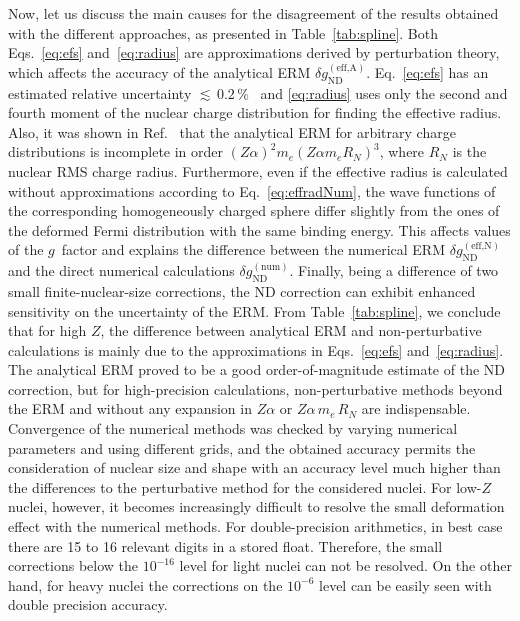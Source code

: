 Now, let us discuss the main causes for the disagreement of the results obtained with the different approaches, as presented in Table~\ref{tab:spline}. Both Eqs.~\eqref{eq:efs} and~\eqref{eq:radius} are approximations derived by perturbation theory, which affects the accuracy of the analytical ERM $\delta g_{\text{ND}}^{(\text{eff,A})}$. Eq.~\eqref{eq:efs} has an estimated relative uncertainty ${\scriptstyle\lesssim}\,0.2\,\%$~\cite{Shabaev1993} and \eqref{eq:radius} uses only the second and fourth moment of the nuclear charge distribution for finding the effective radius. Also, it was shown in Ref.~\cite{karshenboim2018} that the analytical ERM for arbitrary charge distributions is incomplete in order $(Z\alpha)^2m_e(Z\alpha m_e R_N)^3$, where $R_N$ is the nuclear RMS charge radius. Furthermore, even if the effective radius is calculated without approximations according to Eq.~\eqref{eq:effradNum}, the wave functions of the corresponding homogeneously charged sphere differ slightly from the ones of the deformed Fermi distribution with the same binding energy. This affects values of the $g$~factor and explains the difference between the numerical ERM $\delta g_{\text{ND}}^{(\text{eff,N})}$ and the direct numerical calculations $\delta g_{\text{ND}}^{(\text{num})}$. 
Finally, being a difference of two small finite-nuclear-size corrections, the ND correction can exhibit enhanced sensitivity on the uncertainty of the ERM.
From Table~\ref{tab:spline}, we conclude that for high $Z$, the difference between analytical ERM and non-perturbative calculations is mainly due to the approximations in Eqs.~\eqref{eq:efs} and~\eqref{eq:radius}. The analytical ERM proved to be a good order-of-magnitude estimate of the ND correction, but for high-precision calculations, non-perturbative methods beyond the ERM and without any expansion in $Z\alpha$ or $Z\alpha\, m_e\, R_N$ are indispensable. Convergence of the numerical methods was checked by varying numerical parameters and using different grids, and the obtained accuracy permits the consideration of nuclear size and shape with an accuracy level much higher than the differences to the perturbative method for the considered nuclei. For low-$Z$ nuclei, however, it becomes increasingly difficult to resolve the small deformation effect with the numerical methods. For double-precision arithmetics, in best case there are 15 to 16 relevant digits in a stored float. Therefore, the small corrections below the $10^{-16}$ level for light nuclei can not be resolved. On the other hand, for heavy nuclei the corrections on the $10^{-6}$ level can be easily seen with double precision accuracy.\\

